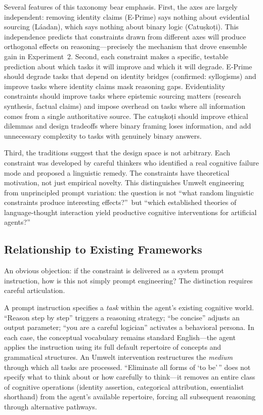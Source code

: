 \documentclass[11pt,a4paper]{article}
\begin{document}
Several features of this taxonomy bear emphasis. First, the axes are largely independent: removing identity claims (E-Prime) says nothing about evidential sourcing (L\'{a}adan), which says nothing about binary logic (Catu\d{s}ko\d{t}i). This independence predicts that constraints drawn from different axes will produce orthogonal effects on reasoning---precisely the mechanism that drove ensemble gain in Experiment~2. Second, each constraint makes a specific, testable prediction about which tasks it will improve and which it will degrade. E-Prime should degrade tasks that depend on identity bridges (confirmed: syllogisms) and improve tasks where identity claims mask reasoning gaps. Evidentiality constraints should improve tasks where epistemic sourcing matters (research synthesis, factual claims) and impose overhead on tasks where all information comes from a single authoritative source. The catu\d{s}ko\d{t}i should improve ethical dilemmas and design tradeoffs where binary framing loses information, and add unnecessary complexity to tasks with genuinely binary answers.

Third, the traditions suggest that the design space is not arbitrary. Each constraint was developed by careful thinkers who identified a real cognitive failure mode and proposed a linguistic remedy. The constraints have theoretical motivation, not just empirical novelty. This distinguishes Umwelt engineering from unprincipled prompt variation: the question is not ``what random linguistic constraints produce interesting effects?''\ but ``which established theories of language-thought interaction yield productive cognitive interventions for artificial agents?''

\subsection{Relationship to Existing Frameworks}
\label{sec:frameworks}

An obvious objection: if the constraint is delivered as a system prompt instruction, how is this not simply prompt engineering? The distinction requires careful articulation.

A prompt instruction specifies a \emph{task} within the agent's existing cognitive world. ``Reason step by step'' triggers a reasoning strategy; ``be concise'' adjusts an output parameter; ``you are a careful logician'' activates a behavioral persona. In each case, the conceptual vocabulary remains standard English---the agent applies the instruction using its full default repertoire of concepts and grammatical structures. An Umwelt intervention restructures the \emph{medium} through which all tasks are processed. ``Eliminate all forms of `to be'\,'' does not specify what to think about or how carefully to think---it removes an entire class of cognitive operations (identity assertion, categorical attribution, essentialist shorthand) from the agent's available repertoire, forcing all subsequent reasoning through alternative pathways.
\end{document}
